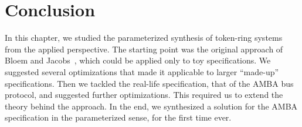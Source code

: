 


\section{Conclusion}\label{tok_rings:sec:conclusion}

In this chapter,
we studied the parameterized synthesis of token-ring systems from the applied perspective.
The starting point was the original approach of Bloem and Jacobs~\cite{JB14},
which could be applied only to toy specifications.
We suggested several optimizations that made
it applicable to larger ``made-up'' specifications.
Then we tackled the real-life specification, that of the AMBA bus protocol,
and suggested further optimizations.
This required us to extend the theory behind the approach.
In the end,
we synthesized a solution for the AMBA specification in the parameterized sense,
for the first time ever.
